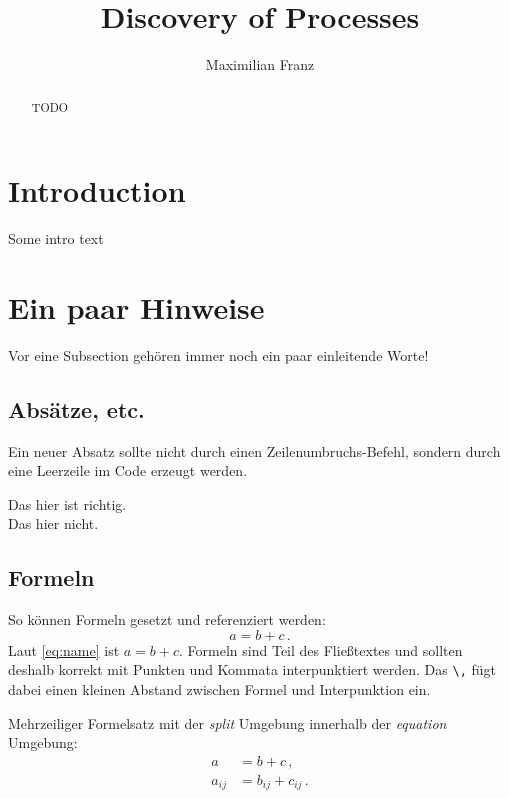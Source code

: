 \documentclass[a4paper]{IEEEtran}
\title{Discovery of Processes}
\author{Maximilian Franz}
\begin{document}
\maketitle

\begin{abstract}
TODO
\end{abstract}

\section{Introduction}
Some intro text

\section{Ein paar Hinweise}

Vor eine Subsection gehören immer noch ein paar einleitende Worte!

\subsection{Absätze, etc.}

Ein neuer Absatz sollte nicht durch einen Zeilenumbruchs-Befehl, sondern durch eine Leerzeile im Code erzeugt werden.

Das hier ist richtig.
\\ Das hier nicht.

\subsection{Formeln}

So können Formeln gesetzt und referenziert werden:
\begin{equation}
    a = b + c \,.
    \label{eq:name}
\end{equation}
Laut \eqref{eq:name} ist $a=b+c$. Formeln sind Teil des Fließtextes und sollten deshalb korrekt mit Punkten und Kommata interpunktiert werden.  Das \texttt{\textbackslash,} fügt dabei einen kleinen Abstand zwischen Formel und Interpunktion ein.

Mehrzeiliger Formelsatz mit der \emph{split} Umgebung innerhalb der \emph{equation} Umgebung:
\begin{equation}
    \begin{split}
        a      &= b + c \,, \\
        a_{ij} &= b_{ij} + c_{ij} \,.
    \end{split}
\end{equation}
\end{document}
